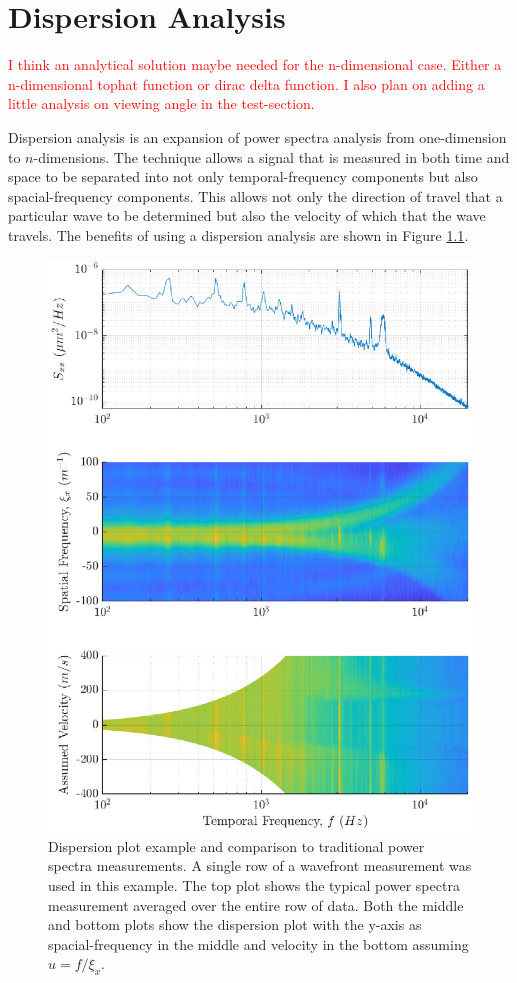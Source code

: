 
\chapter{Dispersion Analysis}
\label{chap:04_dispersion}
\textcolor{red}{I think an analytical solution maybe needed for the n-dimensional case. Either a n-dimensional tophat function or dirac delta function. I also plan on adding a little analysis on viewing angle in the test-section.}

Dispersion analysis is an expansion of power spectra analysis from one-dimension to $n$-dimensions.
The technique allows a signal that is measured in both time and space to be separated into not only temporal-frequency components but also spacial-frequency components.
This allows not only the direction of travel that a particular wave to be determined but also the velocity of which that the wave travels.
The benefits of using a dispersion analysis are shown in Figure \ref{fig:04_dispersion_demo}.
\begin{figure}
\centering
  \includegraphics{../matlab/04_dispersion_analysis/dispersion_demo.eps}
  \caption{Dispersion plot example and comparison to traditional power spectra measurements. A single row of a wavefront measurement was used in this example. The top plot shows the typical power spectra measurement averaged over the entire row of data. Both the middle and bottom plots show the dispersion plot with the y-axis as spacial-frequency in the middle and velocity in the bottom assuming $u=f/\xi_x$.}
  \label{fig:04_dispersion_demo}
\end{figure}
